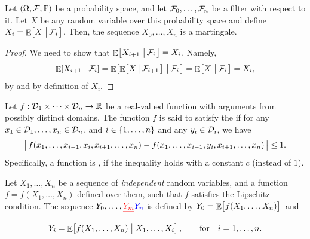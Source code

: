 \begin{theorem}
    Let $(\Omega, \mathcal{F}, \mathbb{P})$ be a probability space, and let
    $\mathcal{F}_0, \ldots, \mathcal{F}_n$ be a filter with respect to it. Let
    $X$ be any random variable over this probability space and define
    $X_i = \mathop{\mathbb{E}}\!\left[ {X \,\left|\, { \mathcal{F}_i} \bigr.\right.} \right]$. Then, the sequence $X_0, \ldots,
    X_n$ is a martingale.
\end{theorem}

\begin{proof}
    We need to show that $\mathop{\mathbb{E}}\!\left[ {X_{i+1} \,\left|\, { \mathcal{F}_i } \bigr.\right.} \right] =
    X_i$. Namely,
    \begin{align*}
      \ExCond{X_{i+1} }{ \Family_i }%
      =%
      \Ex{ \Ex{ X \sepw{\bigl. \Family_{i+1}}} \sep{ \Family_i}}%
      =%
      \Ex{ X \sep{ \Family_i}}%
      =%
      X_i,
    \end{align*}
    by  and by definition of $X_i$.
\end{proof}

\begin{defn}
    Let $f:\mathcal{D}_1 \times \cdots \times \mathcal{D}_n \rightarrow \mathbb{R}$
    be a real-valued function with arguments from possibly distinct
    domains. The function $f$ is said to satisfy the  if for any
    $x_1 \in \mathcal{D}_1, \ldots, x_n \in \mathcal{D}_n$, and
    $i \in \left\{ {1,\ldots,n} \right\}$ and any $y_i \in \mathcal{D}_i$, we have
    \begin{equation*}
        \cardin{\big.\, f(x_1,\ldots, x_{i-1}, x_i, x_{i+1}, \ldots,
           x_n) - f (x_1, \ldots, x_{i-1}, y_i, x_{i+1},\ldots, x_n)%
           \, } \leq 1.
    \end{equation*}
    Specifically, a function is , if the
    inequality holds with a constant $c$ (instead of $1$).
\end{defn}

\begin{defn}
    Let $X_1, \ldots, X_n$ be a sequence of \emph{independent} random
    variables, and a function $f = f( X_1,\ldots, X_n )$ defined over
    them, such that $f$ satisfies the Lipschitz condition. The
     sequence $Y_0, \ldots, \chgY{Y_m}{Y_n}$ is defined by
    $Y_0 = \mathop{\mathbb{E}}\!\left[ {\bigl. f(X_1, \ldots, X_n)} \right]\,$ and
    \begin{equation*}
        \Bigl.  Y_i = \mathop{\mathbb{E}}\!\left[ f(X_1,\ldots, X_n)  \;\middle\vert\; \bigl. X_1, \ldots,
           X_i \right],
        \qquad\text{for}\quad i=1,\ldots, n.
    \end{equation*}
\end{defn}

